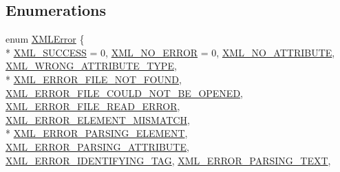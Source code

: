 \subsection*{Enumerations}
\begin{DoxyCompactItemize}
\item 
enum \hyperlink{namespacetinyxml2_a1fbf88509c3ac88c09117b1947414e08}{X\+M\+L\+Error} \{ \\*
\hyperlink{namespacetinyxml2_a1fbf88509c3ac88c09117b1947414e08a1fe1262fdb5ac05dd9cc4631f8c8e00d}{X\+M\+L\+\_\+\+S\+U\+C\+C\+E\+S\+S} = 0, 
\hyperlink{namespacetinyxml2_a1fbf88509c3ac88c09117b1947414e08ad3b3f200ced09c9fc4166134a4ff8fef}{X\+M\+L\+\_\+\+N\+O\+\_\+\+E\+R\+R\+O\+R} = 0, 
\hyperlink{namespacetinyxml2_a1fbf88509c3ac88c09117b1947414e08abefb89c44285fb68e2218b2c71767f27}{X\+M\+L\+\_\+\+N\+O\+\_\+\+A\+T\+T\+R\+I\+B\+U\+T\+E}, 
\hyperlink{namespacetinyxml2_a1fbf88509c3ac88c09117b1947414e08ae9d8ee545a3a69e90df303257a658113}{X\+M\+L\+\_\+\+W\+R\+O\+N\+G\+\_\+\+A\+T\+T\+R\+I\+B\+U\+T\+E\+\_\+\+T\+Y\+P\+E}, 
\\*
\hyperlink{namespacetinyxml2_a1fbf88509c3ac88c09117b1947414e08a38fd2a97fb1dbebd4c3640d75dc01a94}{X\+M\+L\+\_\+\+E\+R\+R\+O\+R\+\_\+\+F\+I\+L\+E\+\_\+\+N\+O\+T\+\_\+\+F\+O\+U\+N\+D}, 
\hyperlink{namespacetinyxml2_a1fbf88509c3ac88c09117b1947414e08afbbf37655523b79a88b04b77ec0f1258}{X\+M\+L\+\_\+\+E\+R\+R\+O\+R\+\_\+\+F\+I\+L\+E\+\_\+\+C\+O\+U\+L\+D\+\_\+\+N\+O\+T\+\_\+\+B\+E\+\_\+\+O\+P\+E\+N\+E\+D}, 
\hyperlink{namespacetinyxml2_a1fbf88509c3ac88c09117b1947414e08a8d4dd3ce2dee784a53f62fa8a6ac83ee}{X\+M\+L\+\_\+\+E\+R\+R\+O\+R\+\_\+\+F\+I\+L\+E\+\_\+\+R\+E\+A\+D\+\_\+\+E\+R\+R\+O\+R}, 
\hyperlink{namespacetinyxml2_a1fbf88509c3ac88c09117b1947414e08a37759723c0c5e954597654e4eccb4f4d}{X\+M\+L\+\_\+\+E\+R\+R\+O\+R\+\_\+\+E\+L\+E\+M\+E\+N\+T\+\_\+\+M\+I\+S\+M\+A\+T\+C\+H}, 
\\*
\hyperlink{namespacetinyxml2_a1fbf88509c3ac88c09117b1947414e08afa96ea783aa93ea212f9e2d7d3a70ba5}{X\+M\+L\+\_\+\+E\+R\+R\+O\+R\+\_\+\+P\+A\+R\+S\+I\+N\+G\+\_\+\+E\+L\+E\+M\+E\+N\+T}, 
\hyperlink{namespacetinyxml2_a1fbf88509c3ac88c09117b1947414e08a380fd8846799b88773321efae83d26a3}{X\+M\+L\+\_\+\+E\+R\+R\+O\+R\+\_\+\+P\+A\+R\+S\+I\+N\+G\+\_\+\+A\+T\+T\+R\+I\+B\+U\+T\+E}, 
\hyperlink{namespacetinyxml2_a1fbf88509c3ac88c09117b1947414e08a48e646cfca6de90c3770faf535d3ed6b}{X\+M\+L\+\_\+\+E\+R\+R\+O\+R\+\_\+\+I\+D\+E\+N\+T\+I\+F\+Y\+I\+N\+G\+\_\+\+T\+A\+G}, 
\hyperlink{namespacetinyxml2_a1fbf88509c3ac88c09117b1947414e08a50ead30b94c7ae2957b9ccb08ec0994d}{X\+M\+L\+\_\+\+E\+R\+R\+O\+R\+\_\+\+P\+A\+R\+S\+I\+N\+G\+\_\+\+T\+E\+X\+T}, 

\end{DoxyCompactItemize}
